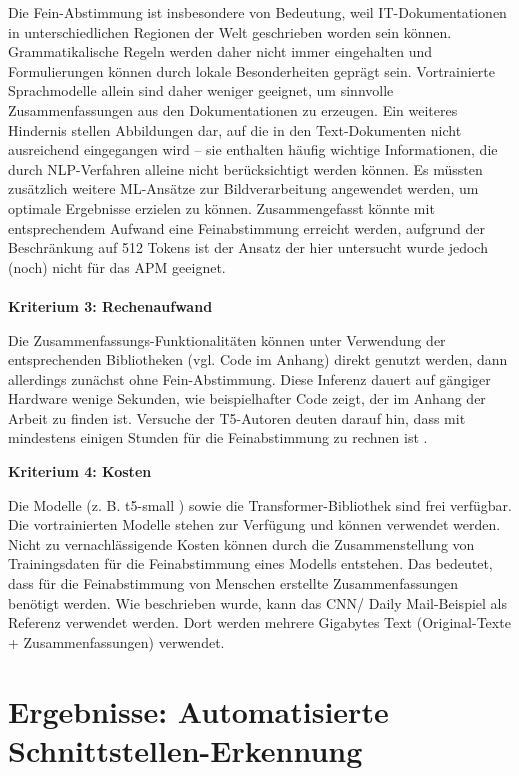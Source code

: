 Die Fein-Abstimmung ist insbesondere von Bedeutung, weil IT-Dokumentationen in unterschiedlichen Regionen der Welt geschrieben worden sein können. Grammatikalische Regeln werden daher nicht immer eingehalten und Formulierungen können durch lokale Besonderheiten geprägt sein. Vortrainierte Sprachmodelle allein sind daher weniger geeignet, um sinnvolle Zusammenfassungen aus den Dokumentationen zu erzeugen. Ein weiteres Hindernis stellen Abbildungen dar, auf die in den Text-Dokumenten nicht ausreichend eingegangen wird – sie enthalten häufig wichtige Informationen, die durch NLP-Verfahren alleine nicht berücksichtigt werden können. Es müssten zusätzlich weitere ML-Ansätze zur Bildverarbeitung angewendet werden, um optimale Ergebnisse erzielen zu können. Zusammengefasst könnte mit entsprechendem Aufwand eine Feinabstimmung erreicht werden, aufgrund der Beschränkung auf 512 Tokens ist der Ansatz der hier untersucht wurde jedoch (noch) nicht für das APM geeignet.
\\
\\

{\bf Kriterium 3: Rechenaufwand}

Die Zusammenfassungs-Funktionalitäten können unter Verwendung der entsprechenden Bibliotheken (vgl. Code im Anhang) direkt genutzt werden, dann allerdings zunächst ohne Fein-Abstimmung. Diese Inferenz dauert auf gängiger Hardware wenige Sekunden, wie beispielhafter Code zeigt, der im Anhang der Arbeit zu finden ist. Versuche der T5-Autoren deuten darauf hin, dass mit mindestens einigen Stunden für die Feinabstimmung zu rechnen ist \cite{Raffel}.

{\bf Kriterium 4: Kosten}

Die Modelle (z. B. t5-small \cite{t5}) sowie die Transformer-Bibliothek \cite{Transformers} sind frei verfügbar. Die vortrainierten Modelle stehen zur Verfügung und können verwendet werden. Nicht zu vernachlässigende Kosten können durch die Zusammenstellung von Trainingsdaten für die Feinabstimmung eines Modells entstehen. Das bedeutet, dass für die Feinabstimmung von Menschen erstellte Zusammenfassungen benötigt werden. Wie beschrieben wurde, kann das CNN/ Daily Mail-Beispiel als Referenz verwendet werden. Dort werden mehrere Gigabytes Text (Original-Texte + Zusammenfassungen) verwendet. 

\section{Ergebnisse: Automatisierte Schnittstellen-Erkennung}

